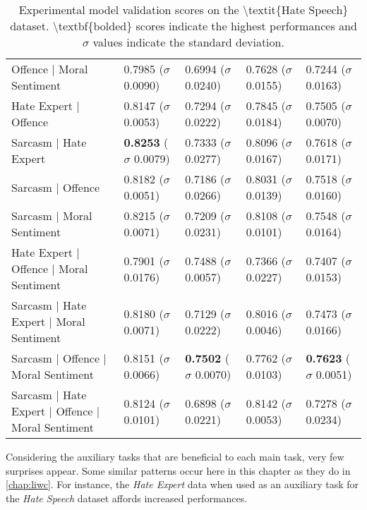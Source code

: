 \begin{table}[]
{\begin{tabular}{l|llll}
    Offence | Moral Sentiment                         & 0.7985 ($\sigma$ 0.0090)          & 0.6994 ($\sigma$ 0.0240)          & 0.7628 ($\sigma$ 0.0155)          & 0.7244 ($\sigma$ 0.0163)          \\
    Hate Expert | Offence                             & 0.8147 ($\sigma$ 0.0053)          & 0.7294 ($\sigma$ 0.0222)          & 0.7845 ($\sigma$ 0.0184)          & 0.7505 ($\sigma$ 0.0070)          \\
    Sarcasm | Hate Expert                             & \textbf{0.8253} ($\sigma$ 0.0079) & 0.7333 ($\sigma$ 0.0277)          & 0.8096 ($\sigma$ 0.0167)          & 0.7618 ($\sigma$ 0.0171)          \\
    Sarcasm | Offence                                 & 0.8182 ($\sigma$ 0.0051)          & 0.7186 ($\sigma$ 0.0266)          & 0.8031 ($\sigma$ 0.0139)          & 0.7518 ($\sigma$ 0.0160)          \\
    Sarcasm | Moral Sentiment                         & 0.8215 ($\sigma$ 0.0071)          & 0.7209 ($\sigma$ 0.0231)          & 0.8108 ($\sigma$ 0.0101)          & 0.7548 ($\sigma$ 0.0164)          \\
    Hate Expert | Offence | Moral Sentiment           & 0.7901 ($\sigma$ 0.0176)          & 0.7488 ($\sigma$ 0.0057)          & 0.7366 ($\sigma$ 0.0227)          & 0.7407 ($\sigma$ 0.0153)          \\
    Sarcasm | Hate Expert | Moral Sentiment           & 0.8180 ($\sigma$ 0.0071)          & 0.7129 ($\sigma$ 0.0222)          & 0.8016 ($\sigma$ 0.0046)          & 0.7473 ($\sigma$ 0.0166)          \\
    Sarcasm | Offence | Moral Sentiment               & 0.8151 ($\sigma$ 0.0066)          & \textbf{0.7502} ($\sigma$ 0.0070) & 0.7762 ($\sigma$ 0.0103)          & \textbf{0.7623} ($\sigma$ 0.0051) \\
    Sarcasm | Hate Expert | Offence | Moral Sentiment & 0.8124 ($\sigma$ 0.0101)          & 0.6898 ($\sigma$ 0.0221)          & 0.8142 ($\sigma$ 0.0053)          & 0.7278 ($\sigma$ 0.0234)
  \end{tabular}%
}
  \caption{Experimental model validation scores on the \textbackslash{}textit\{Hate Speech\} dataset. \textbackslash{}textbf\{bolded\} scores indicate the highest performances and $\sigma$ values indicate the standard deviation.}
  \label{tab:mtl_test_wh}
\end{table}

Considering the auxiliary tasks that are beneficial to each main task, very few surprises appear. Some similar patterns occur here in this chapter as they do in \cref{chap:liwc}.
For instance, the \textit{Hate Expert} data when used as an auxiliary task for the \textit{Hate Speech} dataset affords increased performances.

